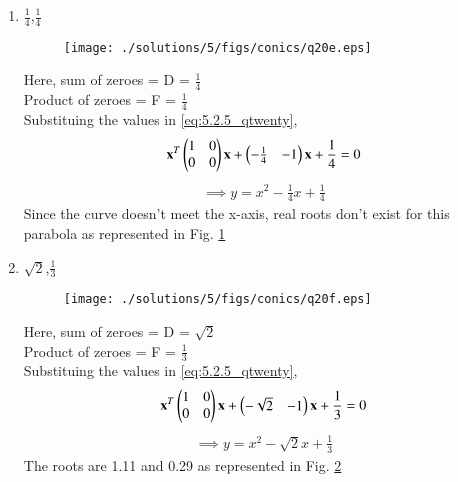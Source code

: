 \begin{enumerate}
		\item $\frac{1}{4}$,$\frac{1}{4}$
	\begin{figure}[!ht]
	\centering
	\texttt{[image: ./solutions/5/figs/conics/q20e.eps]}
	\caption{}
	\label{fig:5.2.5_qtoe}	
	\end{figure}
		
 
Here, sum of zeroes = D = $\frac{1}{4}$\\
Product of zeroes = F = $\frac{1}{4}$\\
Substituing the values in \ref{eq:5.2.5_qtwenty},\\

\begin{multline}
\mathbf{x}^T\begin{pmatrix}1&0\\0&0\end{pmatrix}\mathbf{x}  + \begin{pmatrix}-\frac{1}{4}&-1\end{pmatrix}\mathbf{x} + \frac{1}{4} = 0
\end{multline}
\begin{align}
\implies y = x^2 - \frac{1}{4}x + \frac{1}{4} 
\end{align}
Since the curve doesn't meet the x-axis, real roots don't exist for this parabola as represented in Fig. \ref{fig:5.2.5_qtoe}	

		\item $\sqrt{2}$,$\frac{1}{3}$
	\begin{figure}[!ht]
	\centering
	\texttt{[image: ./solutions/5/figs/conics/q20f.eps]}
	\caption{}
	\label{fig:5.2.5_qtof}	
	\end{figure}

		

Here, sum of zeroes = D = $\sqrt{2}$\\
Product of zeroes = F = $\frac{1}{3}$\\
Substituing the values in \ref{eq:5.2.5_qtwenty},\\
\begin{multline}
\mathbf{x}^T\begin{pmatrix}1&0\\0&0\end{pmatrix}\mathbf{x}  + \begin{pmatrix}-\sqrt{2}&-1\end{pmatrix}\mathbf{x} + \frac{1}{3} = 0
\end{multline}
\begin{align}
\implies y = x^2 - \sqrt{2}x + \frac{1}{3}
\end{align}
The roots are 1.11 and 0.29 as represented in Fig. \ref{fig:5.2.5_qtof}
	\end{enumerate}
